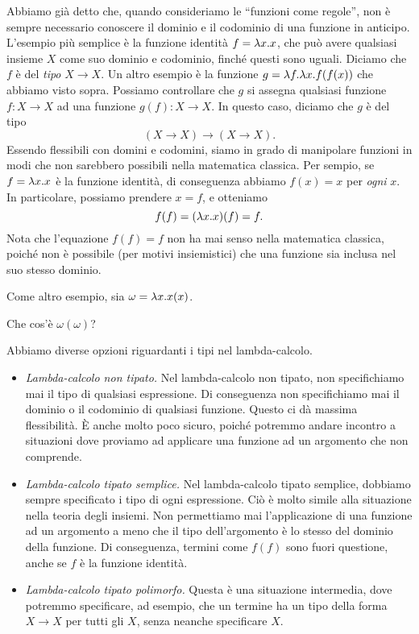 \documentclass{article}
\begin{document}
Abbiamo gi\`a detto che, quando consideriamo le ``funzioni come regole'', 
non \`e sempre necessario conoscere il dominio e il codominio
di una funzione in anticipo. L'esempio pi\`u semplice \`e la funzione identit\`a
$f = \lambda x.x$, che pu\`o avere qualsiasi insieme $X$ come suo dominio e codominio,
finché questi sono uguali. Diciamo che
$f$ \`e del {\em tipo} $X\to X$. Un altro esempio \`e la funzione $g = \lambda f.\lambda
x.f(f(x))$ che abbiamo visto sopra. Possiamo controllare che $g$ si assegna 
qualsiasi funzione $f:X\to X$ ad una funzione $g(f):X\to X$. In questo caso, diciamo
che $g$ \`e del tipo
\[          (X\to X)\to(X\to X).
\]
Essendo flessibili con domini e codomini, siamo in grado
di manipolare funzioni in modi che non sarebbero possibili
nella matematica classica. Per sempio, se $f=\lambda x.x$ \`e la funzione identit\`a,
di conseguenza abbiamo $f(x) = x$ per {\em ogni} $x$. In particolare, possiamo prendere
$x=f$, e otteniamo
\[     f(f) = (\lambda x.x)(f) = f.
\]
Nota che l'equazione $f(f)=f$ non ha mai senso nella matematica
classica, poiché non \`e possibile (per motivi insiemistici) che una
funzione sia inclusa nel suo stesso dominio.

Come altro esempio, sia $\omega = \lambda x.x(x)$. 

\begin{exercise}
  Che cos'\`e $\omega(\omega)$?
\end{exercise}

Abbiamo diverse opzioni riguardanti i tipi nel lambda-calcolo.
\begin{itemize}
\item {\em Lambda-calcolo non tipato.} Nel lambda-calcolo non tipato,
non specifichiamo mai il tipo di qualsiasi espressione. Di conseguenza
non specifichiamo mai il dominio o il codominio di qualsiasi funzione. Questo ci 
d\`a massima flessibilit\`a. \`E anche molto poco sicuro, poiché potremmo andare incontro a
situazioni dove proviamo ad applicare una funzione ad un argomento che
non comprende.
\item {\em Lambda-calcolo tipato semplice.} Nel lambda-calcolo tipato semplice,
dobbiamo sempre specificato i tipo di ogni espressione.
Ci\`o \`e molto simile alla situazione nella teoria degli insiemi. Non permettiamo
mai l'applicazione di una funzione ad un argomento a meno che il tipo
dell'argomento \`e lo stesso del dominio della funzione. Di conseguenza,
termini come $f(f)$ sono fuori questione, anche se $f$ \`e la funzione identit\`a.
\item {\em Lambda-calcolo tipato polimorfo.} Questa \`e una
situazione intermedia, dove potremmo specificare, ad esempio, che
un termine ha un tipo della forma $X\to X$ per tutti gli $X$, senza neanche
specificare $X$.
\end{itemize}
\end{document}
